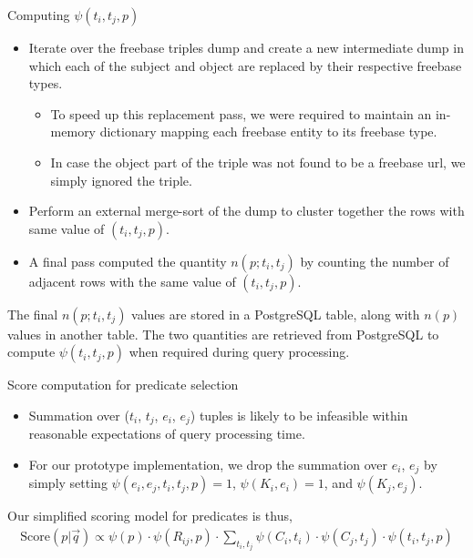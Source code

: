 \documentclass[pdf,11pt]{beamer}
\begin{document}
\begin{frame}{Computing $\psi(t_i, t_j, p)$}

\begin{itemize}
\item Iterate over the freebase triples dump and create a new intermediate dump in which each of the subject and object are replaced by their respective freebase types.
\begin{itemize} \item To speed up this replacement pass, we were required to maintain an in-memory dictionary mapping each freebase entity to its freebase type.
\item In case the object part of the triple was not found to be a freebase url, we simply ignored the triple.
\end{itemize}

\item Perform an external merge-sort of the dump to cluster together the rows with same value of $(t_i,t_j,p)$.
\item A final pass computed the quantity $n(p;t_i,t_j)$ by counting the number of adjacent rows with the same value of $(t_i, t_j,p)$.

\end{itemize}

The final $n(p;t_i,t_j)$ values are stored in a PostgreSQL table, along with $n(p)$ values in another table. The two quantities are retrieved from PostgreSQL to compute $\psi(t_i,t_j,p)$ when required during query processing.

\end{frame}


\begin{frame}{Score computation for predicate selection}

\begin{itemize}
\item Summation over ($t_i$, $t_j$, $e_i$, $e_j$) tuples is likely to be infeasible within reasonable expectations of query processing time.
\item For our prototype implementation, we drop the summation over $e_i$, $e_j$ by simply setting $\psi(e_i,e_j,t_i,	t_j,p) = 1$, $\psi(K_i,e_i) = 1$, and $\psi(K_j,e_j)$.
\end{itemize}

Our simplified scoring model for predicates is thus,
\begin{align}
\text{Score}(p|\vec{q}) \propto \psi(p) \cdot \psi(R_{ij},p) \cdot \sum_{t_i,t_j} \psi(C_i,t_i) \cdot \psi(C_j,t_j) \cdot \psi(t_i,t_j,p) \nonumber
\end{align}

\end{frame}
\end{document}
